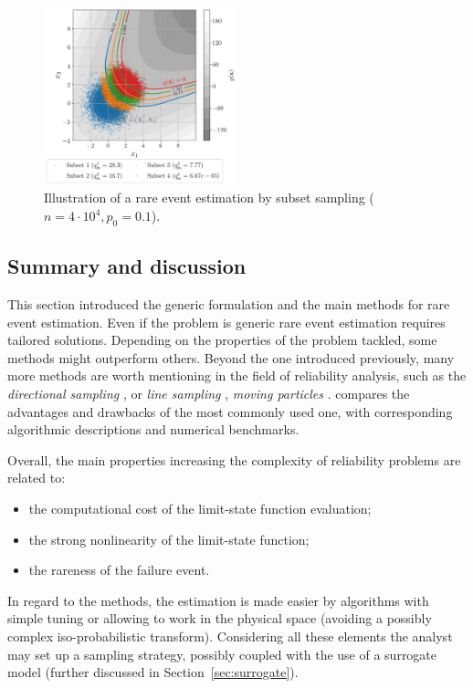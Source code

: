 \begin{figure}
    \centering
    \includegraphics[width=0.5\textwidth]{../numerical_experiments/chapter1/figures/reliability_SS_illustration.png}
    \caption{Illustration of a rare event estimation by subset sampling ($n=4\cdot10^4, p_0 = 0.1$).}
    \label{fig:SS_reliability}
\end{figure}


\subsection{Summary and discussion}

This section introduced the generic formulation and the main methods for rare event estimation. 
Even if the problem is generic rare event estimation requires tailored solutions. 
Depending on the properties of the problem tackled, some methods might outperform others. 
Beyond the one introduced previously, many more methods are worth mentioning in the field of reliability analysis, such as the \textit{directional sampling} \citet{bjerager_1988_directional_sampling}, or \textit{line sampling} \citep{koutsourelakis_2004_line_sampling}, \textit{moving particles} \citep{walter_2015_moving_particles}. 
\citet{MorioBalesdent2015} compares the advantages and drawbacks of the most commonly used one, with corresponding algorithmic descriptions and numerical benchmarks. 

Overall, the main properties increasing the complexity of reliability problems are related to:
\begin{itemize}
    \item the computational cost of the limit-state function evaluation;
    \item the strong nonlinearity of the limit-state function;
    \item the rareness of the failure event.
\end{itemize} 
In regard to the methods, the estimation is made easier by algorithms with simple tuning or allowing to work in the physical space (avoiding a possibly complex iso-probabilistic transform).
Considering all these elements the analyst may set up a sampling strategy, possibly coupled with the use of a surrogate model (further discussed in Section~\ref{sec:surrogate}). 

